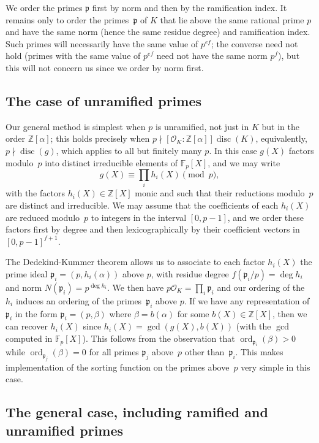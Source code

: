 \documentclass{article}
\def\Z{{\mathbb Z}}
\def\F{{\mathbb F}}
\def\Fp{{\mathbb F}_p}
\def\OO{{\mathcal O}}
\def\p{{\mathfrak p}}
\DeclareMathOperator{\disc}{disc}
\DeclareMathOperator{\ord}{ord}
\begin{document}
We order the primes $\p$ first by norm and then by the ramification
index.  It remains only to order the primes~$\p$ of $K$ that lie above
the same rational prime $p$ and have the same norm (hence the same
residue degree) and ramification index.  Such primes will necessarily
have the same value of $p^{ef}$; the converse need not hold (primes
with the same value of $p^{ef}$ need not have the same norm $p^{f}$),
but this will not concern us since we order by norm first.

\subsection{The case of unramified primes}

Our general method is simplest when $p$ is unramified, not just in $K$
but in the order $\Z[\alpha]$; this holds precisely when $p\nmid [\OO_K:\Z[\alpha]]\disc(K)$, equivalently, $p\nmid\disc(g)$, which applies to all but finitely many $p$.  In this case $g(X)$ factors modulo~$p$ into distinct irreducible elements of $\Fp[X]$, and we may
write
\[
    g(X) \equiv \prod_i h_i(X) \pmod{p},
\]
with the factors $h_i(X)\in\Z[X]$ monic and such that their reductions
modulo~$p$ are distinct and irreducible.  We may assume that the
coefficients of each $h_i(X)$ are reduced modulo~$p$ to integers in the interval $[0,p-1]$, and we order these factors first by degree and then lexicographically by their coefficient vectors in $[0,p-1]^{f+1}$.

The Dedekind-Kummer theorem allows us to associate to each factor
$h_i(X)$ the prime ideal $\p_i=(p,h_i(\alpha))$ above $p$, with
residue degree $f(\p_i/p)=\deg h_i$ and norm $N(\p_i)=p^{\deg h_i}$.
We then have $p\OO_K=\prod_i \p_i$ and our ordering of the $h_i$
induces an ordering of the primes~$\p_i$ above $p$.  If we have any
representation of $\p_i$ in the form $\p_i=(p,\beta)$ where
$\beta=b(\alpha)$ for some $b(X)\in\Z[X]$, then we can recover
$h_i(X)$ since $h_i(X)=\gcd(g(X),b(X))$ (with the $\gcd$ computed in
$\F_p[X]$).  This follows from the observation that
$\ord_{\p_i}(\beta)>0$ while $\ord_{\p_j}(\beta)=0$ for all primes
$\p_j$ above~$p$ other than~$\p_i$.  This makes implementation of the
sorting function on the primes above~$p$ very simple in this case.

\subsection{The general case, including ramified and unramified primes}
\end{document}

